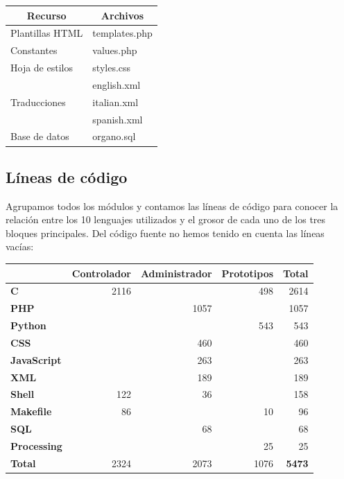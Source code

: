 \begin{center}
	\begin{tabular}{|l|l|}
		\hline \multicolumn{1}{|c|}{\textbf{Recurso}} & \multicolumn{1}{c|}{\textbf{Archivos}}  \\ 
		\hline Plantillas HTML & templates.php \\
		\hline Constantes & values.php \\
		\hline Hoja de estilos & styles.css \\
		\hline \multirow{3}{*}{Traducciones} & english.xml \\
		& italian.xml \\
		& spanish.xml \\
		\hline Base de datos & organo.sql \\
		\hline 
	\end{tabular}
	\smallskip
\end{center}

\smallskip

\subsection{Líneas de código}

Agrupamos todos los módulos y contamos las líneas de código para conocer la relación entre los 10 lenguajes utilizados y el grosor de cada uno de los tres bloques principales. Del código fuente no hemos tenido en cuenta las líneas vacías:

\smallskip

\begin{center}
	\begin{tabular}{|l|r|r|r|r|}
		\hline & \textbf{Controlador} & \textbf{Administrador} & \textbf{Prototipos} & \textbf{Total} \\ 
		\hline \textbf{C} & 2116 & & 498 & 2614 \\
		\hline \textbf{\acrshort{PHP}} & & 1057 & & 1057 \\
		\hline \textbf{Python} &  &  & 543 & 543 \\
		\hline \textbf{CSS} & & 460 & & 460 \\
		\hline \textbf{JavaScript} & & 263 & & 263 \\
		\hline \textbf{XML} & & 189 & & 189 \\
		\hline \textbf{Shell} & 122 & 36 & & 158 \\
		\hline \textbf{Makefile} & 86 &  & 10 & 96 \\
		\hline \textbf{SQL} & & 68 & & 68 \\
		\hline \textbf{Processing} & & & 25 & 25 \\
		\hline \textbf{Total} & 2324 & 2073 & 1076 & \textbf{5473} \\
		\hline 
	\end{tabular}
	\smallskip
\end{center}

